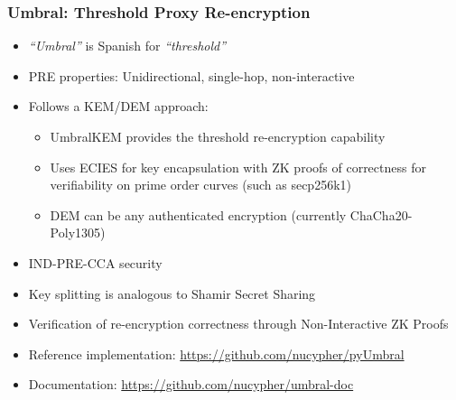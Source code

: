 \documentclass[xetex,mathsans,sans,aspectratio=169]{beamer}
\begin{document}
    \begin{frame}
        \frametitle{Umbral: Threshold Proxy Re-encryption}
        \begin{itemize}
        	\item \emph{``Umbral''} is Spanish for \emph{``threshold''}
            \item PRE properties: Unidirectional, single-hop, non-interactive
            \item Follows a KEM/DEM approach:
            	\begin{itemize}
		    \item UmbralKEM provides the threshold re-encryption capability
                    \item Uses ECIES for key encapsulation with ZK proofs of correctness for verifiability on prime order curves (such as secp256k1)
            	    \item DEM can be any authenticated encryption (currently ChaCha20-Poly1305)
        	\end{itemize}
	    \item IND-PRE-CCA security
            \item Key splitting is analogous to Shamir Secret Sharing
	    \item Verification of re-encryption correctness through Non-Interactive ZK Proofs
            \item Reference implementation: \url{https://github.com/nucypher/pyUmbral}
	    \item Documentation: \url{https://github.com/nucypher/umbral-doc}
        \end{itemize}
    \end{frame}
\end{document}
